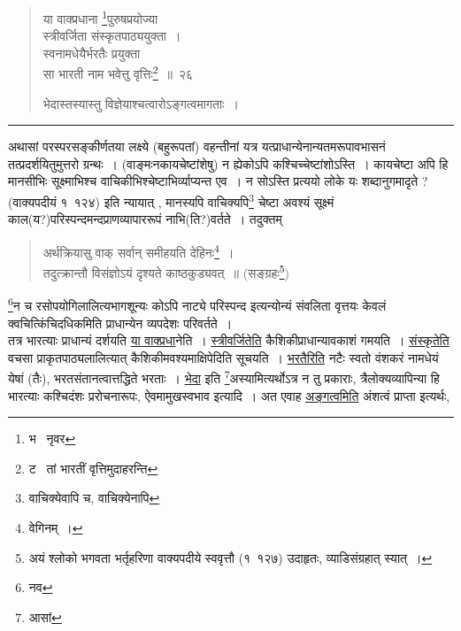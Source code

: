 \documentclass[11pt, openany]{book}
\makeatletter
\newcommand{\devanagarinumeral}[1]{%
	\devanagaridigits{\number \csname c@#1\endcsname}} %
\makeatother
\begin{document}
\cfoot{}
\fancyhead[LE,RO]{\thepage}
\renewcommand{\thepage}{\devanagarinumeral{page}}
\setcounter{page}{91}


\begin{quote}
{\na या वाक्प्रधाना \renewcommand{\thefootnote}{1}\footnote{भ \textendash\ नृवर}पुरुषप्रयोज्या\\
स्त्रीवर्जिता संस्कृतपाठ्ययुक्ता~।\\
स्वनामधेयैर्भरतैः प्रयुक्ता\\
सा भारती नाम भवेत्तु वृत्तिः\renewcommand{\thefootnote}{2}\footnote{ट \textendash\ तां भारतीं वृत्तिमुदाहरन्ति}~॥~२६

भेदास्तस्यास्तु विज्ञेयाश्चत्वारोऽङ्गत्वमागताः~।}
\end{quote}

\hrule

\vspace{2mm}
अथासां परस्परसङ्कीर्णतया लक्ष्ये (बहुरूपतां) वहन्तीनां यत्र यत्प्राधान्येनान्यतमरूपावभासनं तत्प्रदर्शयितुमुत्तरो ग्रन्थः~। (वाङ्मःनकायचेष्टांशेषु) न ह्येकोऽपि कश्चिच्चेष्टांशोऽस्ति~। कायचेष्टा अपि हि मानसीभिः सूक्ष्माभिश्च वाचिकीभिश्चेष्टाभिर्व्याप्यन्त एव~। {\qt न सोऽस्ति प्रत्ययो लोके यः शब्दानुगमादृते ?} (वाक्यपदीयं १\textendash\ १२४) इति न्यायात् , मानस्यपि वाचिक्यपि\renewcommand{\thefootnote}{1}\footnote{वाचिक्येवापि च, वाचिक्येनापि} चेष्टा अवश्यं सूक्ष्मं काल(य?)परिस्पन्दमन्दप्राणव्यापाररूपं नाभि(ति?)वर्तते~। तदुक्तम्\textendash\ 

\begin{quote}
{\qt अर्थक्रियासु वाक् सर्वान् समीहयति देहिनः\renewcommand{\thefootnote}{2}\footnote{वेगिनम्~।}~।\\
तदुत्क्रान्तौ विसंज्ञोऽयं दृश्यते काष्ठकुड्यवत्~॥} (सङ्ग्रहः\renewcommand{\thefootnote}{*}\footnote{अयं श्लोको भगवता भर्तृहरिणा वाक्यपदीये स्ववृत्तौ (१\textendash\ १२७) उदाहृतः, व्याडिसंग्रहात् स्यात्~।})
\end{quote}

\noindent
\renewcommand{\thefootnote}{3}\footnote{नव}न च रसोपयोगिलालित्यभागशून्यः कोऽपि नाट्ये परिस्पन्द इत्यन्योन्यं संवलिता वृत्तयः केवलं क्वचित्किंचिदधिकमिति प्राधान्येन व्यपदेशः परिवर्तते~।\\

तत्र भारत्याः प्राधान्यं दर्शयति \underline{या वाक्प्रधा}नेति~। \underline{स्त्रीवर्जितेति} कैशिकीप्राधान्यावकाशं गमयति~। \underline{संस्कृतेति} वचसा प्राकृतपाठ्यलालित्यात् कैशिकीमवश्यमाक्षिपेदिति सूचयति~। \underline{भरतैरिति} नटैः स्वतो वंशकरं नामधेयं येषां (तैः), भरतसंतानत्वात्तद्धिते भरताः~। \underline{भेदा} इति \renewcommand{\thefootnote}{4}\footnote{आसां}अस्यामित्यर्थोऽत्र न तु प्रकाराः, त्रैलोक्यव्यापिन्या हि भारत्याः कश्चिदंशः प्ररोचनारूपः, ऐवमामुखस्वभाव इत्यादि~। अत एवाह \underline{अङ्गत्वमिति} अंशत्वं प्राप्ता इत्यर्थः,
\end{document}
